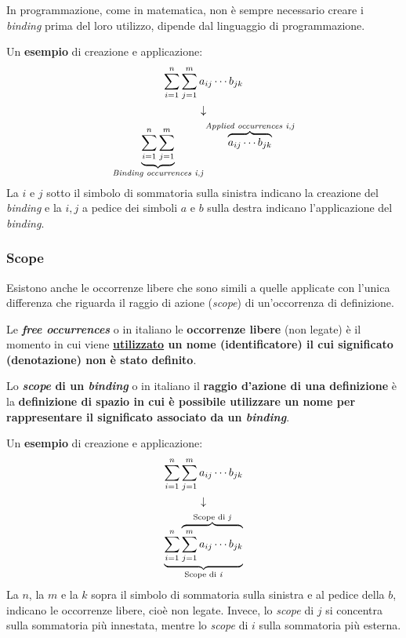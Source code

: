\documentclass[a4paper]{article}
\begin{document}
	\noindent
	In programmazione, come in matematica, non è sempre necessario creare i \emph{binding} prima del loro utilizzo, dipende dal linguaggio di programmazione.\newline
	
	\noindent
	Un \textcolor{Green4}{\textbf{esempio}} di creazione e applicazione:
	\begin{gather*}
		\displaystyle\sum_{i=1}^{n}\sum_{j=1}^{m}a_{ij} \cdots b_{jk} \\
		\downarrow \\
		\displaystyle\underbrace{\sum_{i=1}^{n}\sum_{j=1}^{m}}_{\text{\emph{Binding occurrences i,j}}} \overbrace{a_{ij} \cdots b_{jk}}^{\text{\emph{Applied occurrences i,j}}}
	\end{gather*}
	La $i$ e $j$ sotto il simbolo di sommatoria sulla sinistra indicano la creazione del \emph{binding} e la $i,j$ a pedice dei simboli $a$ e $b$ sulla destra indicano l'applicazione del \emph{binding}.\newpage
	
	\subsubsection{Scope}
	
	Esistono anche le occorrenze libere che sono simili a quelle applicate con l'unica differenza che riguarda il raggio di azione (\emph{scope}) di un'occorrenza di definizione.\newline
	
	\noindent
	\begin{boxdef}
		Le \textcolor{Red3}{\textbf{\emph{free occurrences}}} o in italiano le \textcolor{Red3}{\textbf{occorrenze libere}} (non legate) è il momento in cui viene \textbf{\underline{utilizzato} un nome (identificatore) il cui significato (denotazione) non è stato definito}.
	\end{boxdef}\:\newline

	\noindent
	\begin{boxdef}
		Lo \textcolor{Red3}{\textbf{\emph{scope} di un \emph{binding}}} o in italiano il \textcolor{Red3}{\textbf{raggio d'azione di una definizione}} è la \textbf{definizione di spazio in cui è possibile utilizzare un nome per rappresentare il significato associato da un \emph{binding}}.
	\end{boxdef}\:\newline

	\noindent
	Un \textcolor{Green4}{\textbf{esempio}} di creazione e applicazione:
	\begin{gather*}
		\displaystyle\sum_{i=1}^{n}\sum_{j=1}^{m}a_{ij} \cdots b_{jk} \\
		\downarrow \\
		\displaystyle\underbrace{\sum_{i=1}^{n}\overbrace{\sum_{j=1}^{m} a_{ij} \cdots b_{jk}}^{\text{Scope di \emph{j}}}}_{\text{Scope di \emph{i}}}
	\end{gather*}
	La $n$, la $m$ e la $k$ sopra il simbolo di sommatoria sulla sinistra e al pedice della $b$, indicano le occorrenze libere, cioè non legate. Invece, lo \emph{scope} di $j$ si concentra sulla sommatoria più innestata, mentre lo \emph{scope} di $i$ sulla sommatoria più esterna.\newpage
	
\end{document}
